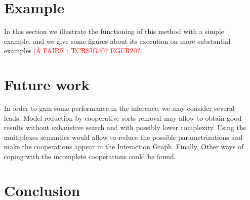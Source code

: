 \documentclass[fleqn,10pt]{article}
\newcommand{\afaire}[1]{\textcolor{red}{[À FAIRE : #1]}}
\begin{document}
\section{Example}
In this section we illustrate the functioning of this method with a simple example, and we give some figures about its execution on more substantial examples \afaire{TCRSIG40? EGFR20?}.

\section{Future work}
In order to gain some performance in the inference, we may consider several leads. Model reduction by cooperative sorts removal may allow to obtain good results without exhaustive search and with possibly lower complexity. Using the multiplexes semantics would allow to reduce the possible parametrizations and make the cooperations appear in the Interaction Graph. Finally, Other ways of coping with the incomplete cooperations could be found.

\section{Conclusion}
\end{document}
